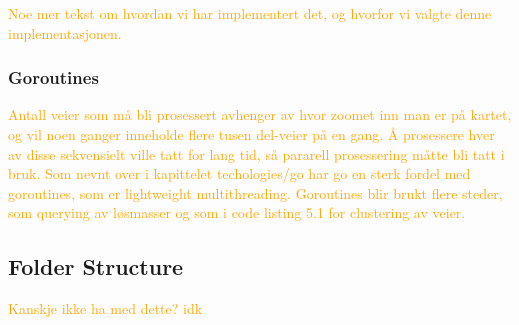 \textcolor{orange}{Noe mer tekst om hvordan vi har implementert det, og hvorfor vi valgte denne implementasjonen.}

\begin{figure}[h]

\end{figure}


\subsubsection{Goroutines}

\textcolor{orange}{Antall veier som må bli prosessert avhenger av hvor zoomet inn man er på kartet, og vil noen ganger inneholde flere tusen del-veier på en gang. Å prosessere hver av disse sekvensielt ville tatt for lang tid, så pararell prosessering måtte bli tatt i bruk. Som nevnt over i kapittelet techologies/go har go en sterk fordel med goroutines, som er lightweight multithreading. Goroutines blir brukt flere steder, som querying av løsmasser og som i code listing 5.1 for clustering av veier. }

\subsection{Folder Structure}

\textcolor{orange}{Kanskje ikke ha med dette? idk}

